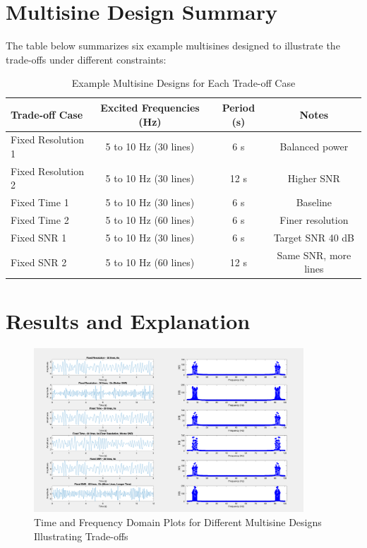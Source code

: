 \documentclass[a4paper,12pt]{article}
\begin{document}
\section*{Multisine Design Summary}
The table below summarizes six example multisines designed to illustrate the trade-offs under different constraints:

\begin{table}[h!]
\centering
\caption{Example Multisine Designs for Each Trade-off Case}
\begin{tabular}{@{}lccc@{}}
\toprule
\textbf{Trade-off Case} & \textbf{Excited Frequencies (Hz)} & \textbf{Period (s)} & \textbf{Notes} \\ \midrule
Fixed Resolution 1 & 5 to 10 Hz (30 lines) & 6 s & Balanced power \\
Fixed Resolution 2 & 5 to 10 Hz (30 lines) & 12 s & Higher SNR \\
Fixed Time 1 & 5 to 10 Hz (30 lines) & 6 s & Baseline \\
Fixed Time 2 & 5 to 10 Hz (60 lines) & 6 s & Finer resolution \\
Fixed SNR 1 & 5 to 10 Hz (30 lines) & 6 s & Target SNR 40 dB \\
Fixed SNR 2 & 5 to 10 Hz (60 lines) & 12 s & Same SNR, more lines \\
\bottomrule
\end{tabular}
\end{table}

\section*{Results and Explanation}

\begin{figure}[h!]
    \centering
    \includegraphics[width=0.9\textwidth]{frf_tradeoff.png}
    \caption{Time and Frequency Domain Plots for Different Multisine Designs Illustrating Trade-offs}
    \label{fig:frf_tradeoff}
\end{figure}
\end{document}
